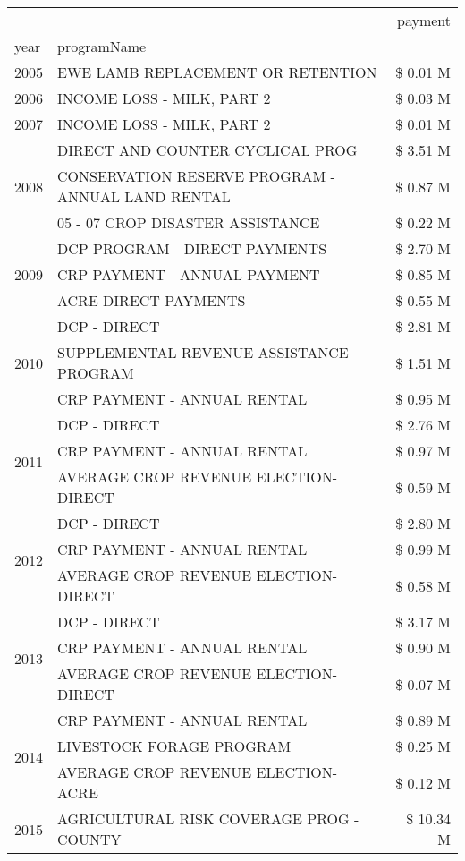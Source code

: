 \begin{tabular}{llr}
\toprule
 &  & payment \\
year & programName &  \\
\midrule
2005 & EWE LAMB REPLACEMENT OR RETENTION & \$ 0.01 M \\
\cline{1-3}
2006 & INCOME LOSS - MILK, PART 2 & \$ 0.03 M \\
\cline{1-3}
2007 & INCOME LOSS - MILK, PART 2 & \$ 0.01 M \\
\cline{1-3}
\multirow[t]{3}{*}{2008} & DIRECT AND COUNTER CYCLICAL PROG & \$ 3.51 M \\
 & CONSERVATION RESERVE PROGRAM - ANNUAL LAND RENTAL & \$ 0.87 M \\
 & 05 - 07 CROP DISASTER ASSISTANCE & \$ 0.22 M \\
\cline{1-3}
\multirow[t]{3}{*}{2009} & DCP PROGRAM - DIRECT PAYMENTS & \$ 2.70 M \\
 & CRP PAYMENT - ANNUAL PAYMENT & \$ 0.85 M \\
 & ACRE DIRECT PAYMENTS & \$ 0.55 M \\
\cline{1-3}
\multirow[t]{3}{*}{2010} & DCP - DIRECT & \$ 2.81 M \\
 & SUPPLEMENTAL REVENUE ASSISTANCE PROGRAM & \$ 1.51 M \\
 & CRP PAYMENT - ANNUAL RENTAL & \$ 0.95 M \\
\cline{1-3}
\multirow[t]{3}{*}{2011} & DCP - DIRECT & \$ 2.76 M \\
 & CRP PAYMENT - ANNUAL RENTAL & \$ 0.97 M \\
 & AVERAGE CROP REVENUE ELECTION-DIRECT & \$ 0.59 M \\
\cline{1-3}
\multirow[t]{3}{*}{2012} & DCP - DIRECT & \$ 2.80 M \\
 & CRP PAYMENT - ANNUAL RENTAL & \$ 0.99 M \\
 & AVERAGE CROP REVENUE ELECTION-DIRECT & \$ 0.58 M \\
\cline{1-3}
\multirow[t]{3}{*}{2013} & DCP - DIRECT & \$ 3.17 M \\
 & CRP PAYMENT - ANNUAL RENTAL & \$ 0.90 M \\
 & AVERAGE CROP REVENUE ELECTION-DIRECT & \$ 0.07 M \\
\cline{1-3}
\multirow[t]{3}{*}{2014} & CRP PAYMENT - ANNUAL RENTAL & \$ 0.89 M \\
 & LIVESTOCK FORAGE PROGRAM & \$ 0.25 M \\
 & AVERAGE CROP REVENUE ELECTION-ACRE & \$ 0.12 M \\
\cline{1-3}
\multirow[t]{3}{*}{2015} & AGRICULTURAL RISK COVERAGE PROG - COUNTY & \$ 10.34 M \\

\end{tabular}
